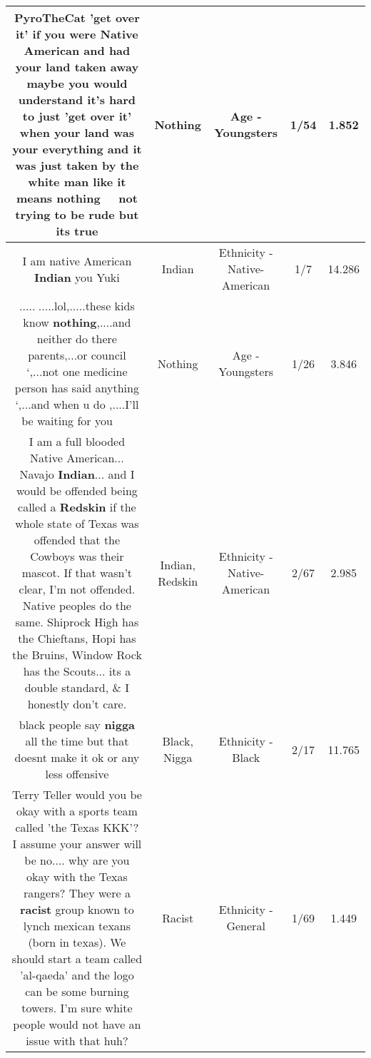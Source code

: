 \documentclass[11pt]{article}
\newlength\mylength
\begin{document}
\begin{center}
\begin{longtable}{|C{.65\mylength}|C{.30\mylength}|C{.12\mylength}|C{.12\mylength}|C{.12\mylength}|}
  \small PyroTheCat 'get over it' if you were Native American and had your land taken away maybe you would understand it's hard to just 'get over it' when your land was your everything and it was just taken by the white man like it means \textbf{nothing} 🤷🏽‍♀️ not trying to be rude but its true\normalsize   & Nothing & Age - Youngsters & 1/54 & 1.852 \\  \hline
  \small I am native American \textbf{Indian} you Yuki\normalsize   & Indian & Ethnicity - Native-American & 1/7 & 14.286 \\  \hline
  \small .....🦊.....lol,.....these kids know \textbf{nothing},....and neither do there parents,...or council ‘,...not one medicine person has said anything ‘,...and when u do ,....I'll be waiting for you 🐾🐾🐾🐾🐾\normalsize   & Nothing & Age - Youngsters & 1/26 & 3.846 \\  \hline
  \small I am a full blooded Native American... Navajo \textbf{Indian}... and I would be offended being called a \textbf{Redskin} if the whole state of Texas was offended that the Cowboys was their mascot. If that wasn't clear, I'm not offended. Native peoples do the same. Shiprock High has the Chieftans, Hopi has the Bruins, Window Rock has the Scouts... its a double standard, \& I honestly don't care.\normalsize   & Indian, Redskin & Ethnicity - Native-American & 2/67 & 2.985 \\  \hline
  \small black people say \textbf{nigga} all the time but that doesnt make it ok or any less offensive\normalsize   & Black, Nigga & Ethnicity - Black & 2/17 & 11.765 \\  \hline
  \small Terry Teller would you be okay with a sports team called 'the Texas KKK'? I assume your answer will be no.... why are you okay with the Texas rangers? They were a \textbf{racist} group known to lynch mexican texans (born in texas). We should start a team called  'al-qaeda' and the logo can be some burning towers. I'm sure white people would not have an issue with that huh?\normalsize   & Racist & Ethnicity - General & 1/69 & 1.449 \\  \hline

\end{longtable}
\end{center}
\end{document}
